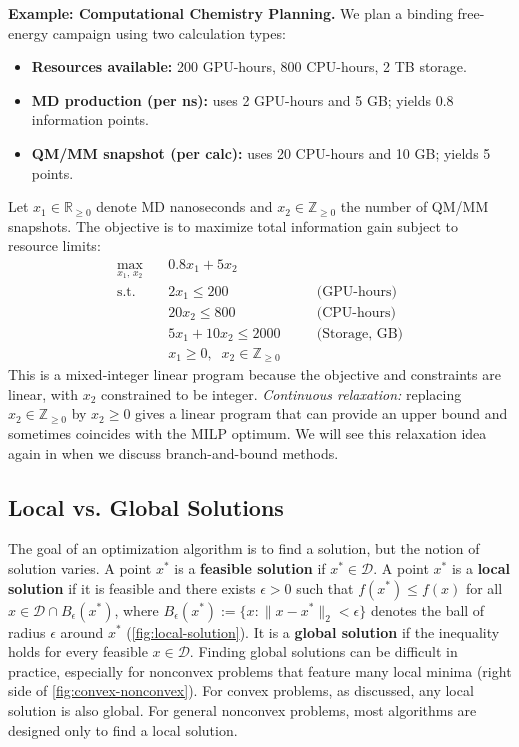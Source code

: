 \begin{exampleBox}
    \textbf{Example: Computational Chemistry Planning.}
    We plan a binding free-energy campaign using two calculation types:
    \begin{itemize}
      \item \textbf{Resources available:} 200 GPU-hours, 800 CPU-hours, 2 TB storage.
      \item \textbf{MD production (per ns):} uses 2 GPU-hours and 5 GB; yields 0.8 information points.
      \item \textbf{QM/MM snapshot (per calc):} uses 20 CPU-hours and 10 GB; yields 5 points.
    \end{itemize}
    Let $x_1 \in \mathbb{R}_{\ge 0}$ denote MD nanoseconds and $x_2 \in \mathbb{Z}_{\ge 0}$ the number of QM/MM snapshots. 
    The objective is to maximize total information gain subject to resource limits:
    \[
    \begin{aligned}
    \max_{x_1,\,x_2}\quad & 0.8x_1 + 5x_2\\[2pt]
    \text{s.t.}\quad 
      & 2x_1 \le 200 \quad &&\text{(GPU-hours)}\\
      & 20x_2 \le 800 \quad &&\text{(CPU-hours)}\\
      & 5x_1 + 10x_2 \le 2000 \quad &&\text{(Storage, GB)}\\
      & x_1 \ge 0,\;\; x_2 \in \mathbb{Z}_{\ge 0}
    \end{aligned}
    \]
    This is a mixed-integer linear program because the objective and constraints are linear, with $x_2$ constrained to be integer.
    \emph{Continuous relaxation:} replacing $x_2 \in \mathbb{Z}_{\ge 0}$ by $x_2 \ge 0$ gives a linear program that can provide an upper bound and sometimes coincides with the MILP optimum. We will see this relaxation idea again in  when we discuss branch-and-bound methods.
\end{exampleBox}


\subsection{Local vs. Global Solutions}
The goal of an optimization algorithm is to find a solution, but the notion of solution varies. A point $x^*$ is a \textbf{feasible solution} if $x^* \in \mathcal{D}$. A point $x^*$ is a \textbf{local solution} if it is feasible and there exists $\epsilon>0$ such that $f(x^*) \le f(x)$ for all $x \in \mathcal{D} \cap B_{\epsilon}(x^*)$, where $B_\epsilon(x^*) := \{x : \|x-x^*\|_2 < \epsilon\}$ denotes the ball of radius $\epsilon$ around $x^*$ (\autoref{fig:local-solution}). It is a \textbf{global solution} if the inequality holds for every feasible $x \in \mathcal{D}$. Finding global solutions can be difficult in practice, especially for nonconvex problems that feature many local minima (right side of \autoref{fig:convex-nonconvex}). For convex problems, as discussed, any local solution is also global. For general nonconvex problems, most algorithms are designed only to find a local solution.

